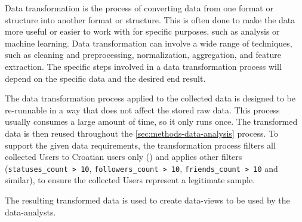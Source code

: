 Data transformation is the process of converting data from one format or structure into another format or structure. This is often done to make the data more useful or easier to work with for specific purposes, such as analysis or machine learning. Data transformation can involve a wide range of techniques, such as cleaning and preprocessing, normalization, aggregation, and feature extraction. The specific steps involved in a data transformation process will depend on the specific data and the desired end result.

The data transformation process applied to the collected data is designed to be re-runnable in a way that does not affect the stored raw data. This process usually consumes a large amount of time, so it only runs once. The transformed data is then reused throughout the \ref{sec:methods-data-analysis} process. To support the given data requirements, the transformation process filters all collected Users to Croatian users only () and applies other filters (\texttt{statuses\_count > 10}, \texttt{followers\_count > 10}, \texttt{friends\_count > 10} and similar), to ensure the collected Users represent a legitimate sample.

The resulting transformed data is used to create \glspl{data-view} to be used by the \Glspl{data-analyst}.



\clearpage

